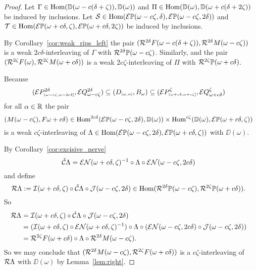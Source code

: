 \begin{proof}
  Let $\Gamma\in\mathrm{Hom}(\mathbb{D}(\omega-c(\delta+\zeta)), \mathbb{D}(\omega))$ and $\Pi\in\mathrm{Hom}(\mathbb{D}(\omega), \mathbb{D}(\omega+c(\delta+2\zeta))$ be induced by inclusions.
  Let $\mathcal{S}\in\mathrm{Hom}(\mathcal{E} \mathbb{P}(\omega-c\zeta,\delta), \mathcal{E} \mathbb{P}(\omega-c\zeta,2\delta))$ and $\mathcal{T}\in\mathrm{Hom}(\mathcal{E} \mathbb{P}(\omega+c\delta,\zeta), \mathcal{E} \mathbb{P}(\omega+c\delta,2\zeta))$ be induced by inclusions.

  By Corollary~\ref{cor:weak_rips_left} the pair $(\mathcal{R}^{2\delta} F(\omega-c(\delta+\zeta)),\mathcal{R}^{2\delta} M(\omega-c\zeta))$ is a weak $2c\delta$-interleaving of $\Gamma$ with $\mathcal{R}^{2\delta}\mathbb{P}(\omega-c\zeta)$.
  Similarly,  and the pair $(\mathcal{R}^{2\zeta} F(\omega),\mathcal{R}^{2\zeta} M(\omega+c\delta))$ is a weak $2c\zeta$-interleaving of $\Pi$ with $\mathcal{R}^{2\zeta}\mathbb{P}(\omega+c\delta)$.

  Because
  \[ (\mathcal{E} P_{\scriptscriptstyle (\omega-c\zeta, \alpha-2c{\delta}]}^{2\delta},\mathcal{E} Q_{\omega-c\zeta}^{2\delta})\subseteq (D_{\scriptscriptstyle (\omega, \alpha]}, B_\omega)\subseteq (\mathcal{E} P_{\scriptscriptstyle (\omega+c\delta, \alpha+c\zeta]}^\zeta,\mathcal{E} Q_{\omega+c\delta}^\zeta) \]
  for all $\alpha\in\mathbb{R}$ the pair
  \[ (M(\omega-c\zeta), F{\omega+c\delta})\in\mathrm{Hom}^{2c\delta}(\mathcal{E} \mathbb{P}(\omega-c\zeta,2\delta), \mathbb{D}(\omega))\times \mathrm{Hom}^{c\zeta}(\mathbb{D}(\omega), \mathcal{E} \mathbb{P}(\omega+c\delta, \zeta))\]
  is a weak $c\zeta$-interleaving of $\Lambda\in\mathrm{Hom}(\mathcal{E} \mathbb{P}(\omega-c\zeta,2\delta), \mathcal{E} \mathbb{P}(\omega+c\delta, \zeta))$ with $\DD(\omega)$.

  By Corollary~\ref{cor:excisive_nerve}
  \[\check{\mathcal{C}}\Lambda = \mathcal{E}\mathcal{N}(\omega+c\delta,\zeta)^{-1}\circ\Lambda\circ \mathcal{E}\mathcal{N}(\omega-c\zeta,2c\delta)\]
  and define
  \[\mathcal{R}\Lambda := \mathcal{I}(\omega+c\delta, \zeta)\circ \check{\mathcal{C}}\Lambda\circ \mathcal{J}(\omega-c\zeta, 2\delta)\in\mathrm{Hom}(\mathcal{R}^{2\delta}\mathbb{P}(\omega-c\zeta), \mathcal{R}^{2\zeta}\mathbb{P}(\omega+c\delta)).\]
  So
  \begin{align*}
    \mathcal{R}\Lambda &= \mathcal{I}(\omega+c\delta, \zeta)\circ \check{\mathcal{C}}\Lambda\circ \mathcal{J}(\omega-c\zeta, 2\delta)\\
      &= (\mathcal{I}(\omega+c\delta, \zeta)\circ \mathcal{E}\mathcal{N}(\omega+c\delta,\zeta)^{-1})\circ\Lambda \circ (\mathcal{E}\mathcal{N}(\omega-c\zeta,2c\delta)\circ\mathcal{J}(\omega-c\zeta, 2\delta))\\
      &= \mathcal{R}^{2\zeta} F(\omega+c\delta)\circ \Lambda\circ \mathcal{R}^{2\delta} M(\omega-c\zeta).
  \end{align*}
  So we may conclude that $(\mathcal{R}^{2\delta} M(\omega-c\zeta), \mathcal{R}^{2\zeta} F(\omega+c\delta))$ is a $c\zeta$-interleaving of $\mathcal{R}\Lambda$ with $\DD(\omega)$ by Lemma~\ref{lem:right}.


\end{proof}
